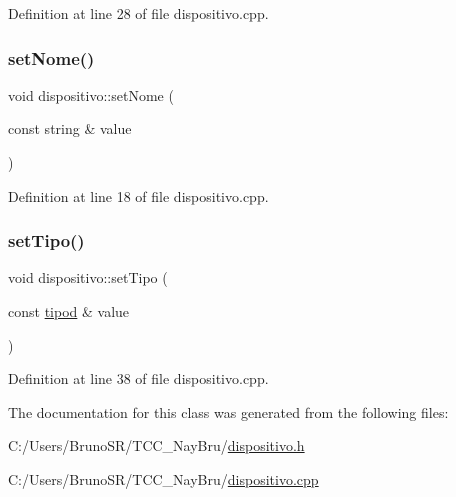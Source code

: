 Definition at line 28 of file dispositivo.\+cpp.

\hypertarget{classdispositivo_a1d57090d304269e4fc75695bcdce1d30}{}\label{classdispositivo_a1d57090d304269e4fc75695bcdce1d30} 
\subsubsection{\texorpdfstring{set\+Nome()}{setNome()}}
{\footnotesize\ttfamily void dispositivo\+::set\+Nome (\begin{DoxyParamCaption}\item[{const string \&}]{value }\end{DoxyParamCaption})}



Definition at line 18 of file dispositivo.\+cpp.

\hypertarget{classdispositivo_a4789a0c9d01d1a80eb1e947044a72fd7}{}\label{classdispositivo_a4789a0c9d01d1a80eb1e947044a72fd7} 
\subsubsection{\texorpdfstring{set\+Tipo()}{setTipo()}}
{\footnotesize\ttfamily void dispositivo\+::set\+Tipo (\begin{DoxyParamCaption}\item[{const \hyperlink{classtipod}{tipod} \&}]{value }\end{DoxyParamCaption})}



Definition at line 38 of file dispositivo.\+cpp.



The documentation for this class was generated from the following files\+:\begin{DoxyCompactItemize}
\item 
C\+:/\+Users/\+Bruno\+S\+R/\+T\+C\+C\+\_\+\+Nay\+Bru/\hyperlink{dispositivo_8h}{dispositivo.\+h}\item 
C\+:/\+Users/\+Bruno\+S\+R/\+T\+C\+C\+\_\+\+Nay\+Bru/\hyperlink{dispositivo_8cpp}{dispositivo.\+cpp}\end{DoxyCompactItemize}
